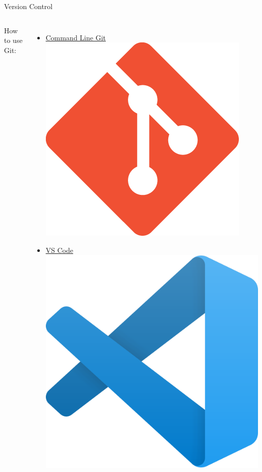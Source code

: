 \documentclass{beamer} %
\begin{document}
  \begin{frame}{Version Control}
    \begin{columns}
        How to use Git:
        \begin{itemize}
          \item \href{https://git-scm.com/}{Command Line Git \includegraphics[height=.05\textheight]{git}}
          \item \href{https://code.visualstudio.com/}{VS Code \includegraphics[height=.05\textheight]{vscode}}

\end{itemize}
\end{columns}
\end{frame}
\end{document}
